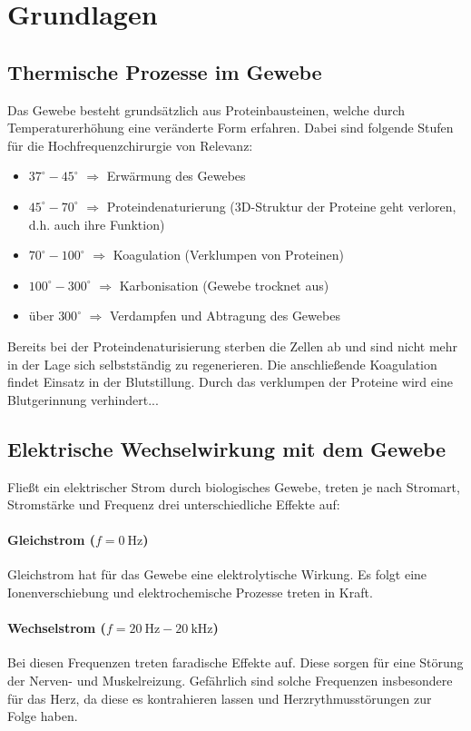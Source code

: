 \documentclass[letterpaper,12pt]{article}
\begin{document}
	
	\newpage
	\section{Grundlagen}
	
		\subsection{Thermische Prozesse im Gewebe}
		
		Das Gewebe besteht grundsätzlich aus Proteinbausteinen, welche durch Temperaturerhöhung eine veränderte Form erfahren. Dabei sind folgende Stufen für die Hochfrequenzchirurgie von Relevanz:
		\begin{itemize}
			\item $37^\circ-45^\circ$ $\Rightarrow$ Erwärmung des Gewebes
			\item $45^\circ-70^\circ$ $\Rightarrow$ Proteindenaturierung (3D-Struktur der Proteine geht verloren, d.h. auch ihre Funktion)
			\item $70^\circ-100^\circ$ $\Rightarrow$ Koagulation (Verklumpen von Proteinen)
			\item $100^\circ-300^\circ$ $\Rightarrow$ Karbonisation (Gewebe trocknet aus)
			\item über $300^\circ$ $\Rightarrow$ Verdampfen und Abtragung des Gewebes
		\end{itemize}
		Bereits bei der Proteindenaturisierung sterben die Zellen ab und sind nicht mehr in der Lage sich selbstständig zu regenerieren. Die anschließende Koagulation findet Einsatz in der Blutstillung. Durch das verklumpen der Proteine wird eine Blutgerinnung verhindert...
	
		\subsection{Elektrische Wechselwirkung mit dem Gewebe}
	
			Fließt ein elektrischer Strom durch biologisches Gewebe, treten je nach Stromart, Stromstärke und Frequenz drei unterschiedliche Effekte auf:
			\paragraph{Gleichstrom ($f=\SI{0}{\hertz}$)}
			Gleichstrom hat für das Gewebe eine elektrolytische Wirkung. Es folgt eine Ionenverschiebung und elektrochemische Prozesse treten in Kraft. 
			\paragraph{Wechselstrom ($f=\SI{20}{\hertz}-\SI{20}{\kilo\hertz}$)}
			Bei diesen Frequenzen treten faradische Effekte auf. Diese sorgen für eine Störung der Nerven- und Muskelreizung. Gefährlich sind solche Frequenzen insbesondere für das Herz, da diese es kontrahieren lassen und Herzrythmusstörungen zur Folge haben.
\end{document}
